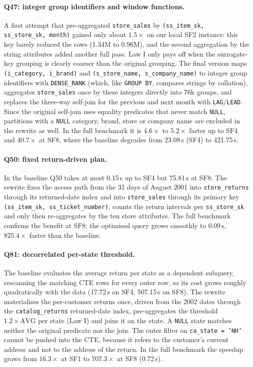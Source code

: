 \documentclass{ULBreport}
\begin{document}
\paragraph{Q47: integer group identifiers and window functions.} A first attempt that pre-aggregated \texttt{store\_sales} by \texttt{(ss\_item\_sk, ss\_store\_sk, month)} gained only about $1.5\times$ on our local SF2 instance: this key barely reduced the rows (1.34M to 0.96M), and the second aggregation by the string attributes added another full pass. Law I only pays off when the surrogate-key grouping is clearly coarser than the original grouping. The final version maps \texttt{(i\_category, i\_brand)} and \texttt{(s\_store\_name, s\_company\_name)} to integer group identifiers with \texttt{DENSE\_RANK} (which, like \texttt{GROUP BY}, compares strings by collation), aggregates \texttt{store\_sales} once by these integers directly into 76k groups, and replaces the three-way self-join for the previous and next month with \texttt{LAG}/\texttt{LEAD}. Since the original self-join uses equality predicates that never match \texttt{NULL}, partitions with a \texttt{NULL} category, brand, store or company name are excluded in the rewrite as well. In the full benchmark it is $4.6\times$ to $5.2\times$ faster up to SF4 and $40.7\times$ at SF8, where the baseline degrades from 23.08\,s (SF4) to 421.75\,s.

\paragraph{Q50: fixed return-driven plan.} In the baseline Q50 takes at most 0.15\,s up to SF4 but 75.81\,s at SF8. The rewrite fixes the access path from the 31 days of August 2001 into \texttt{store\_returns} through its returned-date index and into \texttt{store\_sales} through its primary key \texttt{(ss\_item\_sk, ss\_ticket\_number)}, counts the return intervals per \texttt{ss\_store\_sk} and only then re-aggregates by the ten store attributes. The full benchmark confirms the benefit at SF8: the optimised query grows smoothly to 0.09\,s, $825.4\times$ faster than the baseline.

\paragraph{Q81: decorrelated per-state threshold.} The baseline evaluates the average return per state as a dependent subquery, rescanning the matching CTE rows for every outer row, so its cost grows roughly quadratically with the data (17.72\,s on SF4, 507.15\,s on SF8). The rewrite materialises the per-customer returns once, driven from the 2002 dates through the \texttt{catalog\_returns} returned-date index, pre-aggregates the threshold $1.2 \times \text{AVG}$ per state (Law I) and joins it on the state. A \texttt{NULL} state matches neither the original predicate nor the join. The outer filter on \texttt{ca\_state = 'NH'} cannot be pushed into the CTE, because it refers to the customer's current address and not to the address of the return. In the full benchmark the speedup grows from $16.3\times$ at SF1 to $707.3\times$ at SF8 (0.72\,s).
\end{document}
